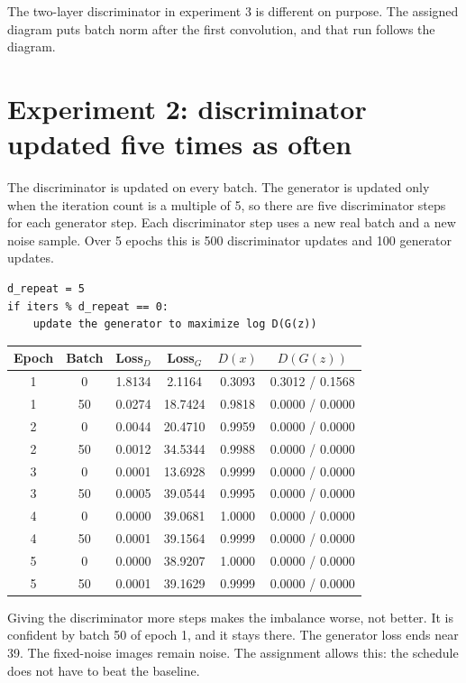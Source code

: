 \documentclass[11pt]{article}
\begin{document}
The two-layer discriminator in experiment 3 is different on purpose. The assigned diagram puts batch norm after the first convolution, and that run follows the diagram.

\section{Experiment 2: discriminator updated five times as often}

The discriminator is updated on every batch. The generator is updated only when the iteration count is a multiple of 5, so there are five discriminator steps for each generator step. Each discriminator step uses a new real batch and a new noise sample. Over 5 epochs this is 500 discriminator updates and 100 generator updates.

\begin{verbatim}
d_repeat = 5
if iters % d_repeat == 0:
    update the generator to maximize log D(G(z))
\end{verbatim}

\begin{center}
\small
\begin{tabular}{@{}cccccc@{}}
\toprule
Epoch & Batch & Loss\(_D\) & Loss\(_G\) & \(D(x)\) & \(D(G(z))\) \\
\midrule
1 & 0 & 1.8134 & 2.1164 & 0.3093 & 0.3012 / 0.1568 \\
1 & 50 & 0.0274 & 18.7424 & 0.9818 & 0.0000 / 0.0000 \\
2 & 0 & 0.0044 & 20.4710 & 0.9959 & 0.0000 / 0.0000 \\
2 & 50 & 0.0012 & 34.5344 & 0.9988 & 0.0000 / 0.0000 \\
3 & 0 & 0.0001 & 13.6928 & 0.9999 & 0.0000 / 0.0000 \\
3 & 50 & 0.0005 & 39.0544 & 0.9995 & 0.0000 / 0.0000 \\
4 & 0 & 0.0000 & 39.0681 & 1.0000 & 0.0000 / 0.0000 \\
4 & 50 & 0.0001 & 39.1564 & 0.9999 & 0.0000 / 0.0000 \\
5 & 0 & 0.0000 & 38.9207 & 1.0000 & 0.0000 / 0.0000 \\
5 & 50 & 0.0001 & 39.1629 & 0.9999 & 0.0000 / 0.0000 \\
\bottomrule
\end{tabular}
\end{center}

\clearpage
Giving the discriminator more steps makes the imbalance worse, not better. It is confident by batch 50 of epoch 1, and it stays there. The generator loss ends near 39. The fixed-noise images remain noise. The assignment allows this: the schedule does not have to beat the baseline.
\end{document}
